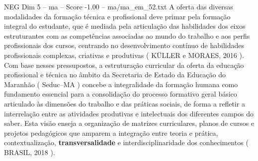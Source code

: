 \begin{textsample}{NEG Dim 5 – ma – Score -1.00 – ma/ma\_em\_52.txt}
A oferta das diversas modalidades da formação técnica e profissional deve primar pela formação integral do estudante, que é mediada pela articulação das habilidades dos eixos estruturantes com as competências associadas ao mundo do trabalho e aos perfis profissionais dos cursos, centrando no desenvolvimento contínuo de habilidades profissionais complexas, criativas e produtivas ( KÜLLER e MORAES, 2016 ).
Com base nesses pressupostos, a estruturação curricular da oferta da educação profissional e técnica no âmbito da Secretaria de Estado da Educação do Maranhão ( Seduc–MA ) concebe a integralidade da formação humana como fundamento essencial para a consolidação do processo formativo geral básico articulado às dimensões do trabalho e das práticas sociais, de forma a refletir a interrelação entre as atividades produtivas e intelectuais dos diferentes campos do saber.
Esta visão enseja a organização de matrizes curriculares, planos de cursos e projetos pedagógicos que amparem a integração entre teoria e prática, contextualização, \textbf{transversalidade} e interdisciplinaridade dos conhecimentos ( BRASIL, 2018 ).

\end{textsample}
